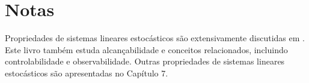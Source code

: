 \section{Notas}
Propriedades de sistemas lineares estocásticos são extensivamente discutidas
em \cite{anderson-moore1979}. Este livro também estuda alcançabilidade
e conceitos relacionados, incluindo controlabilidade e observabilidade.
Outras propriedades de sistemas lineares estocásticos são apresentadas
no Capítulo 7.




